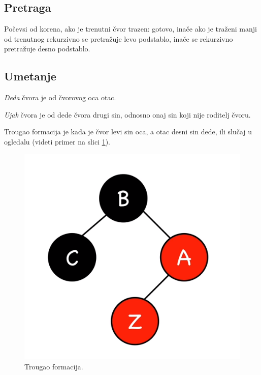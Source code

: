 \documentclass[a4paper]{article}
\begin{document}
\subsection{Pretraga}

Počevsi od korena, ako je trenutni čvor trazen: gotovo, inače ako
je traženi manji od trenutnog rekurzivno se pretražuje levo podstablo, inače se rekurzivno pretražuje desno podstablo.

\subsection{Umetanje}
\textit{Deda} čvora je od čvorovog oca otac.

\textit{Ujak} čvora je od dede čvora drugi sin, odnosno onaj sin koji nije roditelj čvoru.


    Trougao formacija je kada je čvor levi sin oca, a otac desni sin dede, ili slučaj u ogledalu 
    (videti primer na slici \ref{fig:triangle}).
    \begin{figure}[h!]
        \begin{center}
        \includegraphics[scale=0.3]{triangle.png}
        \end{center}
        \caption{Trougao formacija.}
        \label{fig:triangle}
    \end{figure}
\end{document}

